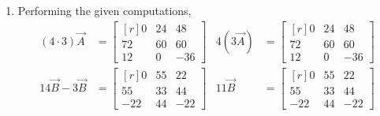 \begin{enumerate}
    \item Performing the given computations,
          \begin{align}
              (4 \cdot 3) \vec{A}  & = \begin{bmatrix*}[r]
                                           0  & 24 & 48  \\
                                           72 & 60 & 60  \\
                                           12 & 0  & -36
                                       \end{bmatrix*} &
              4 (3\vec{A})         & = \begin{bmatrix*}[r]
                                           0  & 24 & 48  \\
                                           72 & 60 & 60  \\
                                           12 & 0  & -36
                                       \end{bmatrix*} \\
              14\vec{B} - 3\vec{B} & = \begin{bmatrix*}[r]
                                           0   & 55 & 22  \\
                                           55  & 33 & 44  \\
                                           -22 & 44 & -22
                                       \end{bmatrix*} &
              11\vec{B}            & = \begin{bmatrix*}[r]
                                           0   & 55 & 22  \\
                                           55  & 33 & 44  \\
                                           -22 & 44 & -22
                                       \end{bmatrix*}
          \end{align}


\end{enumerate}
